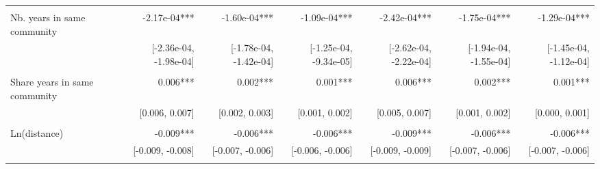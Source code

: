 \begin{table}[!h]
\begin{tabular}{lllllll}
  \multicolumn{1}{r}{} &
  \multicolumn{1}{r}{} &
  \multicolumn{1}{r}{} &
  \multicolumn{1}{r}{} &
  \multicolumn{1}{r}{} \\
\multicolumn{1}{l}{Nb. years in same community} &
  \multicolumn{1}{|r}{-2.17e-04***} &
  \multicolumn{1}{r}{-1.60e-04***} &
  \multicolumn{1}{r}{-1.09e-04***} &
  \multicolumn{1}{r}{-2.42e-04***} &
  \multicolumn{1}{r}{-1.75e-04***} &
  \multicolumn{1}{r}{-1.29e-04***} \\
\multicolumn{1}{l}{} &
  \multicolumn{1}{|r}{[-2.36e-04, -1.98e-04]} &
  \multicolumn{1}{r}{[-1.78e-04, -1.42e-04]} &
  \multicolumn{1}{r}{[-1.25e-04, -9.34e-05]} &
  \multicolumn{1}{r}{[-2.62e-04, -2.22e-04]} &
  \multicolumn{1}{r}{[-1.94e-04, -1.55e-04]} &
  \multicolumn{1}{r}{[-1.45e-04, -1.12e-04]} \\
\multicolumn{1}{l}{} &
  \multicolumn{1}{|r}{} &
  \multicolumn{1}{r}{} &
  \multicolumn{1}{r}{} &
  \multicolumn{1}{r}{} &
  \multicolumn{1}{r}{} &
  \multicolumn{1}{r}{} \\
\multicolumn{1}{l}{Share years in same community} &
  \multicolumn{1}{|r}{0.006***} &
  \multicolumn{1}{r}{0.002***} &
  \multicolumn{1}{r}{0.001***} &
  \multicolumn{1}{r}{0.006***} &
  \multicolumn{1}{r}{0.002***} &
  \multicolumn{1}{r}{0.001***} \\
\multicolumn{1}{l}{} &
  \multicolumn{1}{|r}{[0.006,   0.007]} &
  \multicolumn{1}{r}{[0.002,   0.003]} &
  \multicolumn{1}{r}{[0.001,   0.002]} &
  \multicolumn{1}{r}{[0.005,   0.007]} &
  \multicolumn{1}{r}{[0.001,   0.002]} &
  \multicolumn{1}{r}{[0.000,   0.001]} \\
\multicolumn{1}{l}{} &
  \multicolumn{1}{|r}{} &
  \multicolumn{1}{r}{} &
  \multicolumn{1}{r}{} &
  \multicolumn{1}{r}{} &
  \multicolumn{1}{r}{} &
  \multicolumn{1}{r}{} \\
\multicolumn{1}{l}{Ln(distance)} &
  \multicolumn{1}{|r}{-0.009***} &
  \multicolumn{1}{r}{-0.006***} &
  \multicolumn{1}{r}{-0.006***} &
  \multicolumn{1}{r}{-0.009***} &
  \multicolumn{1}{r}{-0.006***} &
  \multicolumn{1}{r}{-0.006***} \\
\multicolumn{1}{l}{} &
  \multicolumn{1}{|r}{[-0.009,  -0.008]} &
  \multicolumn{1}{r}{[-0.007,  -0.006]} &
  \multicolumn{1}{r}{[-0.006,  -0.006]} &
  \multicolumn{1}{r}{[-0.009,  -0.009]} &
  \multicolumn{1}{r}{[-0.007,  -0.006]} &
  \multicolumn{1}{r}{[-0.007,  -0.006]} \\
\multicolumn{1}{l}{} &
  \multicolumn{1}{|r}{} &
  \multicolumn{1}{r}{} &
  \multicolumn{1}{r}{} &
  \multicolumn{1}{r}{} &
  \multicolumn{1}{r}{} &

\end{tabular}
\end{table}
